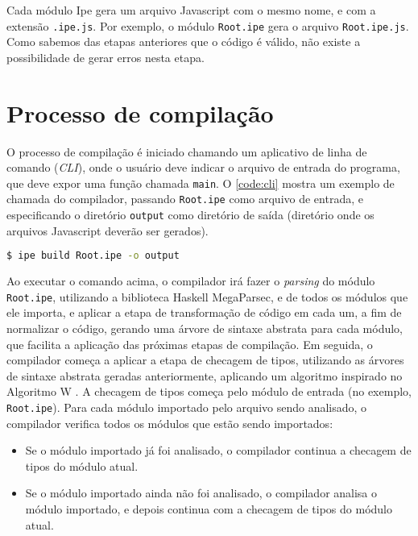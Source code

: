 Cada módulo Ipe gera um arquivo Javascript com o mesmo nome, e com a extensão
\texttt{.ipe.js}. Por exemplo, o módulo \texttt{Root.ipe} gera o arquivo \texttt{Root.ipe.js}. Como
sabemos das etapas anteriores que o código é válido, não existe a possibilidade de gerar erros nesta
etapa.

\section{Processo de compilação}\label{sec:processo_de_compilacao}

O processo de compilação é iniciado chamando um aplicativo de linha de comando (\textit{CLI}), onde
o usuário deve indicar o arquivo de entrada do programa, que deve expor uma função chamada
\texttt{main}. O \autoref{code:cli} mostra  um exemplo de chamada do compilador, passando
\texttt{Root.ipe} como arquivo de entrada, e especificando o diretório \texttt{output} como diretório
de saída (diretório onde os arquivos Javascript deverão ser gerados).

\begin{lstlisting}[language=Bash,label={code:cli},caption={Chamada do aplicativo de linha de comando}]
$ ipe build Root.ipe -o output
\end{lstlisting}

Ao executar o comando acima, o compilador irá fazer o \textit{parsing} do módulo \texttt{Root.ipe},
utilizando a biblioteca Haskell MegaParsec, e de todos os módulos que ele importa, e aplicar a etapa
de transformação de código em cada um, a fim de normalizar o código, gerando uma árvore de sintaxe
abstrata para cada módulo, que facilita a aplicação das próximas etapas de compilação. Em seguida,
o compilador começa a aplicar a etapa de checagem de tipos, utilizando as árvores de sintaxe abstrata
geradas anteriormente, aplicando um algoritmo inspirado no Algoritmo W \cite{understaingalgorithmw}.
A checagem de tipos começa pelo módulo de entrada (no exemplo, \texttt{Root.ipe}). Para cada módulo
importado pelo arquivo sendo analisado, o compilador verifica todos os módulos que estão sendo importados:

\begin{itemize}
      \item Se o módulo importado já foi analisado, o compilador continua a checagem de tipos do módulo
            atual.
      \item Se o módulo importado ainda não foi analisado, o compilador analisa o módulo importado, e
            depois continua com a checagem de tipos do módulo atual.
\end{itemize}

